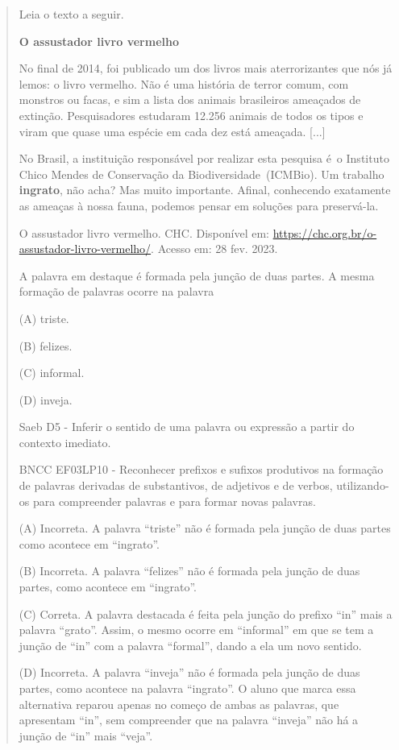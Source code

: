 \begin{quote}
Leia o texto a seguir.

\textbf{O assustador livro vermelho}

No final de 2014, foi publicado um dos livros mais aterrorizantes que
nós já lemos: o livro vermelho. Não é uma história de terror comum, com
monstros ou facas, e sim a lista dos animais brasileiros ameaçados de
extinção. Pesquisadores estudaram 12.256 animais de todos os tipos e
viram que quase uma espécie em cada dez está ameaçada. {[}...{]}

No Brasil, a instituição responsável por realizar esta pesquisa é~o
Instituto Chico Mendes de Conservação da Biodiversidade~(ICMBio). Um
trabalho \textbf{ingrato}, não acha? Mas muito importante. Afinal,
conhecendo exatamente as ameaças à nossa fauna, podemos pensar em
soluções para preservá-la.

O assustador livro vermelho. CHC. Disponível em:
\url{https://chc.org.br/o-assustador-livro-vermelho/}. Acesso em: 28
fev. 2023.

A palavra em destaque é formada pela junção de duas partes. A mesma
formação de palavras ocorre na palavra

(A) triste.

(B) felizes.

(C) informal.

(D) inveja.

Saeb D5 - Inferir o sentido de uma palavra ou expressão a partir do
contexto imediato.

BNCC EF03LP10 - Reconhecer prefixos e sufixos produtivos na formação de
palavras derivadas de substantivos, de adjetivos e de verbos,
utilizando-os para compreender palavras e para formar novas palavras.

(A) Incorreta. A palavra ``triste'' não é formada pela junção de duas
partes como acontece em ``ingrato''.

(B) Incorreta. A palavra ``felizes'' não é formada pela junção de duas
partes, como acontece em ``ingrato''.

(C) Correta. A palavra destacada é feita pela junção do prefixo ``in''
mais a palavra ``grato''. Assim, o mesmo ocorre em ``informal'' em que
se tem a junção de ``in'' com a palavra ``formal'', dando a ela um novo
sentido.

(D) Incorreta. A palavra ``inveja'' não é formada pela junção de duas
partes, como acontece na palavra ``ingrato''. O aluno que marca essa
alternativa reparou apenas no começo de ambas as palavras, que
apresentam ``in'', sem compreender que na palavra ``inveja'' não há a
junção de ``in'' mais ``veja''.
\end{quote}

